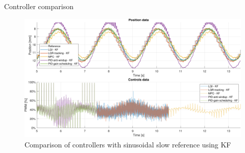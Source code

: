 \begin{frame}{Controller comparison}

    \vspace{9pt}

    \begin{figure}[H]
        \centering
        \includegraphics[width=1\linewidth]{./img/MATLAB/results/sinusoidal_fast_star_KF.pdf}
        \caption{Comparison of controllers with sinusoidal slow reference using KF}
    \end{figure}

\end{frame}



